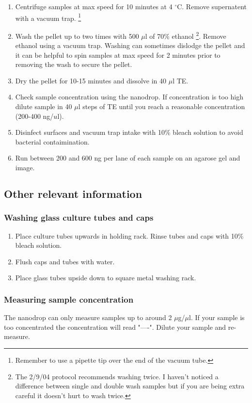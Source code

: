 \documentclass[12pt]{article}
\theoremstyle{definition}
\begin{document}
\begin{enumerate}
	\item Centrifuge samples at max speed for 10 minutes at 4  $^{\circ}$C. Remove supernatent with a vacuum trap. \footnote{Remember to use a pipette tip over the end of the vacuum tube.}
	
	\item Wash the pellet up to two times with 500 $\mu$l of 70\% ethanol \footnote{The 2/9/04 protocol recommends washing twice. I haven't noticed a difference between single and double wash samples but if you are being extra careful it doesn't hurt to wash twice.}. Remove ethanol using a vacuum trap. Washing can sometimes dislodge the pellet and it can be helpful to spin samples at max speed for 2 minutes prior to removing the wash to secure the pellet.
	
	\item Dry the pellet for 10-15 minutes and dissolve in 40 $\mu$l TE. 
	
	\item Check sample concentration using the nanodrop. If concentration is too high dilute sample in 40 $\mu$l steps of TE until you reach a reasonable concentration (200-400 ng/$u$l).
	
	\item Disinfect surfaces and vacuum trap intake with 10\% bleach solution to avoid bacterial contaimination.
	
	\item Run between 200 and 600 ng per lane of each sample on an agarose gel and image.


\end{enumerate}

\subsection*{Other relevant information}

\subsubsection*{Washing glass culture tubes and caps}

\begin{enumerate}
	\item Place culture tubes upwards in holding rack. Rinse tubes and caps with 10\% bleach solution.
	\item Flush caps and tubes with water.
	\item Place glass tubes upside down to square metal washing rack.
\end{enumerate}

\subsubsection*{Measuring sample concentration}

The nanodrop can only measure samples up to around 2 $\mu$g/$\mu$l. If your sample is too concentrated the concentration will read "----". Dilute your sample and re-measure.
\end{document}
